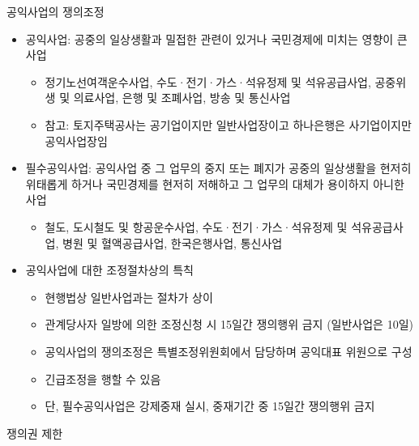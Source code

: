 \documentclass[aspectratio=169,xcolor=dvipsnames,handout]{beamer}
\begin{document}
\begin{frame}[allowframebreaks]{공익사업의 쟁의조정}
    \begin{itemize}[<+->]
        \item 공익사업: 공중의 일상생활과 밀접한 관련이 있거나 국민경제에 미치는 영향이 큰 사업
        \begin{itemize}[<+->]
            \item 정기노선여객운수사업, 수도·전기·가스·석유정제 및 석유공급사업, 공중위생 및 의료사업, 은행 및 조폐사업, 방송 및 통신사업 
            \item 참고: 토지주택공사는 공기업이지만 일반사업장이고 하나은행은 사기업이지만 공익사업장임
        \end{itemize}
        \item 필수공익사업: 공익사업 중 그 업무의 중지 또는 폐지가 공중의 일상생활을 현저히 위태롭게 하거나 국민경제를 현저히 저해하고 그 업무의 대체가 용이하지 아니한 사업
        \begin{itemize}[<+->]
            \item 철도, 도시철도 및 항공운수사업, 수도·전기·가스·석유정제 및 석유공급사업, 병원 및 혈액공급사업, 한국은행사업, 통신사업
        \end{itemize}
        \item 공익사업에 대한 조정절차상의 특칙
        \begin{itemize}[<+->]
            \item 현행법상 일반사업과는 절차가 상이
            \item 관계당사자 일방에 의한 조정신청 시 15일간 쟁의행위 금지 (일반사업은 10일)
            \item 공익사업의 쟁의조정은 특별조정위원회에서 담당하며 공익대표 위원으로 구성
            \item 긴급조정을 행할 수 있음
            \item 단, 필수공익사업은 강제중재 실시, 중재기간 중 15일간 쟁의행위 금지
        \end{itemize}
    \end{itemize}
    \begin{table}
        \centering
        \resizebox{.8\textwidth}{!}{\relax
            
        }
        \caption{쟁의권 제한}
    \end{table}
\end{frame}
\end{document}
